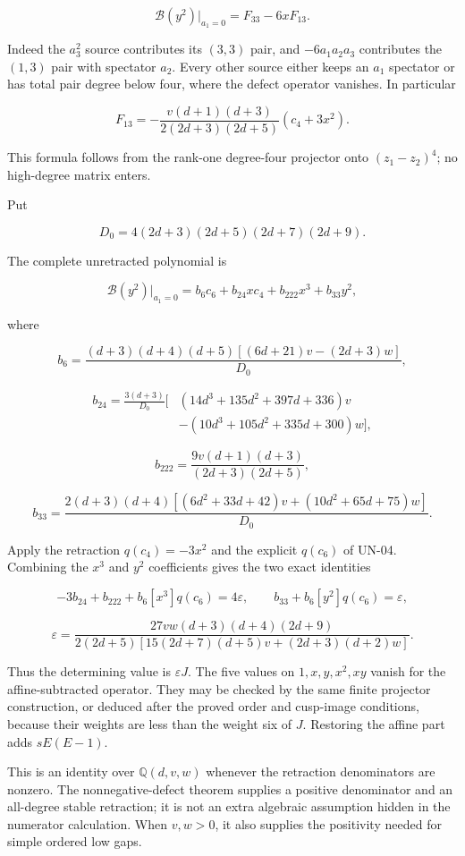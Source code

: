 \[
\mathscr B(y^2)\big|_{a_1=0}
=F_{33}-6xF_{13}.
\]

Indeed the \(a_3^2\) source contributes its \((3,3)\) pair, and \(-6a_1a_2a_3\) contributes the \((1,3)\) pair with spectator \(a_2\). Every other source either keeps an \(a_1\) spectator or has total pair degree below four, where the defect operator vanishes. In particular

\[
F_{13}=
-\frac{v(d+1)(d+3)}{2(2d+3)(2d+5)}(c_4+3x^2).
\]

This formula follows from the rank-one degree-four projector onto \((z_1-z_2)^4\); no high-degree matrix enters.

Put

\[
D_0=4(2d+3)(2d+5)(2d+7)(2d+9).
\]

The complete unretracted polynomial is

\[
\mathscr B(y^2)\big|_{a_1=0}
=b_6c_6+b_{24}xc_4+b_{222}x^3+b_{33}y^2,
\]

where

\[
b_6=
\frac{(d+3)(d+4)(d+5)[(6d+21)v-(2d+3)w]}{D_0},
\]

\[
\begin{aligned}
b_{24}=\frac{3(d+3)}{D_0}\big[
&(14d^3+135d^2+397d+336)v\\
&-(10d^3+105d^2+335d+300)w\big],
\end{aligned}
\]

\[
b_{222}=\frac{9v(d+1)(d+3)}{(2d+3)(2d+5)},
\]

\[
b_{33}=
\frac{2(d+3)(d+4)[(6d^2+33d+42)v+(10d^2+65d+75)w]}{D_0}.
\]

Apply the retraction \(q(c_4)=-3x^2\) and the explicit \(q(c_6)\) of UN-04. Combining the \(x^3\) and \(y^2\) coefficients gives the two exact identities

\[
-3b_{24}+b_{222}+b_6[x^3]q(c_6)=4\varepsilon,
\qquad
b_{33}+b_6[y^2]q(c_6)=\varepsilon,
\]

\[
\varepsilon=
\frac{27vw(d+3)(d+4)(2d+9)}
{2(2d+5)[15(2d+7)(d+5)v+(2d+3)(d+2)w]}.
\]

Thus the determining value is \(\varepsilon J\). The five values on \(1,x,y,x^2,xy\) vanish for the affine-subtracted operator. They may be checked by the same finite projector construction, or deduced after the proved order and cusp-image conditions, because their weights are less than the weight six of \(J\). Restoring the affine part adds \(sE(E-1)\).

This is an identity over \(\mathbb Q(d,v,w)\) whenever the retraction denominators are nonzero. The nonnegative-defect theorem supplies a positive denominator and an all-degree stable retraction; it is not an extra algebraic assumption hidden in the numerator calculation. When \(v,w>0\), it also supplies the positivity needed for simple ordered low gaps.

